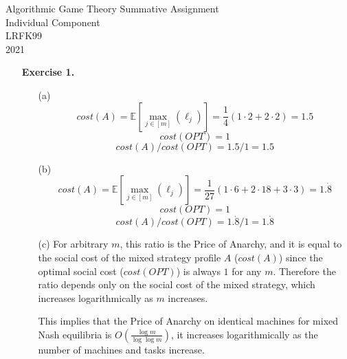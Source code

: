 \documentclass{article}
\begin{document}
\begin{center}
	\LARGE{Algorithmic Game Theory Summative Assignment \\Individual Component}\\[0.1cm]
	\Large{LRFK99}\\[0.1cm]
	2021\\[0.5cm]
\end{center}

\begin{enumerate}
	
	\item[\textbf{Exercise 1.}]   %
	
	\begin{enumerate}
		\item[(a)]
		\begin{equation*}
			cost(A) = \mathbb{E}[\max_{j \in [m]}{(\ell_j)}] = \frac{1}{4}(1 \cdot 2 + 2 \cdot 2) = 1.5
		\end{equation*}
		\begin{equation*}
			cost(OPT) = 1
		\end{equation*}
		\begin{equation*}
			cost(A)/cost(OPT) = 1.5/1 = 1.5
		\end{equation*}
		\item[(b)]
		\begin{equation*}
			cost(A) = \mathbb{E}[\max_{j \in [m]}{(\ell_j)}] = \frac{1}{27}(1 \cdot 6 + 2 \cdot 18 + 3 \cdot 3) = 1.\dot{8}
		\end{equation*}
		\begin{equation*}
			cost(OPT) = 1
		\end{equation*}
		\begin{equation*}
			cost(A)/cost(OPT) = 1.\dot{8}/1 = 1.\dot{8}
		\end{equation*}
		\item[(c)]
		For arbitrary $m$, this ratio is the Price of Anarchy, 
		and it is equal to the social cost of the mixed strategy profile $A$ ($cost(A)$) since the optimal social cost ($cost(OPT)$) is always $1$ for any $m$. 
		Therefore the ratio depends only on the social cost of the mixed strategy, which increases logarithmically as $m$ increases. 

		This implies that the Price of Anarchy on identical machines for mixed Nash equilibria is $O(\frac{\log m}{\log \log m})$, 
		it increases logarithmically as the number of machines and tasks increase. 
	\end{enumerate}
	


\end{enumerate}
\end{document}
